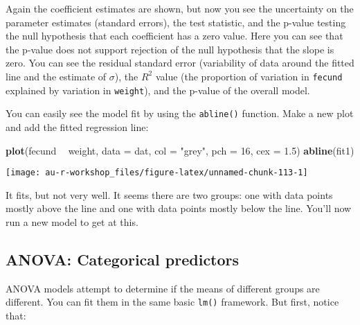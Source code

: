 \documentclass[]{book}
\newenvironment{Shaded}{\begin{snugshade}}{\end{snugshade}}
\newcommand{\KeywordTok}[1]{\textcolor[rgb]{0.13,0.29,0.53}{\textbf{#1}}}
\newcommand{\DataTypeTok}[1]{\textcolor[rgb]{0.13,0.29,0.53}{#1}}
\newcommand{\DecValTok}[1]{\textcolor[rgb]{0.00,0.00,0.81}{#1}}
\newcommand{\FloatTok}[1]{\textcolor[rgb]{0.00,0.00,0.81}{#1}}
\newcommand{\StringTok}[1]{\textcolor[rgb]{0.31,0.60,0.02}{#1}}
\newcommand{\OperatorTok}[1]{\textcolor[rgb]{0.81,0.36,0.00}{\textbf{#1}}}
\newcommand{\NormalTok}[1]{#1}
\theoremstyle{definition}
\theoremstyle{definition}
\theoremstyle{definition}
\theoremstyle{remark}
\begin{document}
Again the coefficient estimates are shown, but now you see the
uncertainty on the parameter estimates (standard errors), the test
statistic, and the p-value testing the null hypothesis that each
coefficient has a zero value. Here you can see that the p-value does not
support rejection of the null hypothesis that the slope is zero. You can
see the residual standard error (variability of data around the fitted
line and the estimate of \(\sigma\)), the \(R^2\) value (the proportion
of variation in \texttt{fecund} explained by variation in
\texttt{weight}), and the p-value of the overall model.

You can easily see the model fit by using the \texttt{abline()}
function. Make a new plot and add the fitted regression line:

\begin{Shaded}
\begin{Highlighting}[]
\KeywordTok{plot}\NormalTok{(fecund }\OperatorTok{~}\StringTok{ }\NormalTok{weight, }\DataTypeTok{data =}\NormalTok{ dat, }\DataTypeTok{col =} \StringTok{"grey"}\NormalTok{, }\DataTypeTok{pch =} \DecValTok{16}\NormalTok{, }\DataTypeTok{cex =} \FloatTok{1.5}\NormalTok{)}
\KeywordTok{abline}\NormalTok{(fit1)}
\end{Highlighting}
\end{Shaded}

\begin{center}\texttt{[image: au-r-workshop\_files/figure-latex/unnamed-chunk-113-1]} \end{center}

It fits, but not very well. It seems there are two groups: one with data
points mostly above the line and one with data points mostly below the
line. You'll now run a new model to get at this.

\subsection{ANOVA: Categorical predictors}\label{anova}

ANOVA models attempt to determine if the means of different groups are
different. You can fit them in the same basic \texttt{lm()} framework.
But first, notice that:

\begin{Shaded}
\end{Shaded}
\end{document}
